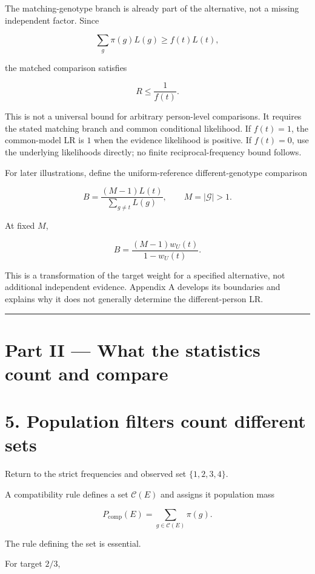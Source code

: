 \documentclass[
]{article}
\begin{document}
The matching-genotype branch is already part of the alternative, not a
missing independent factor. Since

\[
\sum_g\pi(g)L(g)\geq f(t)L(t),
\]

the matched comparison satisfies

\[
R\leq\frac{1}{f(t)}.
\]

This is not a universal bound for arbitrary person-level comparisons. It
requires the stated matching branch and common conditional likelihood.
If \(f(t)=1\), the common-model LR is \(1\) when the evidence likelihood
is positive. If \(f(t)=0\), use the underlying likelihoods directly; no
finite reciprocal-frequency bound follows.

For later illustrations, define the uniform-reference different-genotype
comparison

\[
B=
\frac{(M-1)L(t)}
{\sum_{g\ne t}L(g)},
\qquad M=|\mathcal G|>1.
\]

At fixed \(M\),

\[
B=\frac{(M-1)w_U(t)}{1-w_U(t)}.
\]

This is a transformation of the target weight for a specified
alternative, not additional independent evidence. Appendix A develops
its boundaries and explains why it does not generally determine the
different-person LR.

\begin{center}\rule{0.5\linewidth}{0.5pt}\end{center}

\section{Part II --- What the statistics count and
compare}\label{part-ii-what-the-statistics-count-and-compare}

\section{5. Population filters count different
sets}\label{population-filters-count-different-sets}

Return to the strict frequencies and observed set \(\{1,2,3,4\}\).

A compatibility rule defines a set \(\mathcal C(E)\) and assigns it
population mass

\[
P_{\mathrm{comp}}(E)=\sum_{g\in\mathcal C(E)}\pi(g).
\]

The rule defining the set is essential.

For target \(2/3\),
\end{document}
